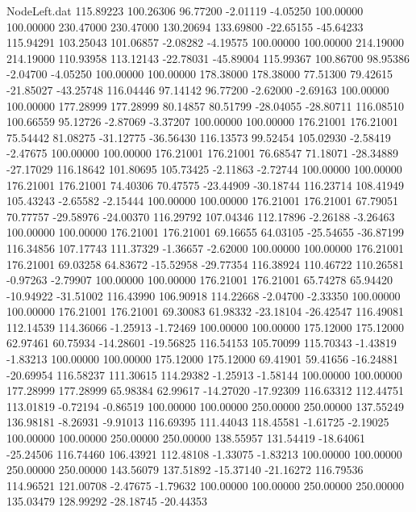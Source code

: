 \begin{filecontents}{NodeLeft.dat}
 115.89223  100.26306   96.77200    -2.01119   -4.05250  100.00000  100.00000  230.47000  230.47000  130.20694  133.69800  -22.65155  -45.64233
 115.94291  103.25043  101.06857    -2.08282   -4.19575  100.00000  100.00000  214.19000  214.19000  110.93958  113.12143  -22.78031  -45.89004
 115.99367  100.86700   98.95386    -2.04700   -4.05250  100.00000  100.00000  178.38000  178.38000   77.51300   79.42615  -21.85027  -43.25748
 116.04446   97.14142   96.77200    -2.62000   -2.69163  100.00000  100.00000  177.28999  177.28999   80.14857   80.51799  -28.04055  -28.80711
 116.08510  100.66559   95.12726    -2.87069   -3.37207  100.00000  100.00000  176.21001  176.21001   75.54442   81.08275  -31.12775  -36.56430
 116.13573   99.52454  105.02930    -2.58419   -2.47675  100.00000  100.00000  176.21001  176.21001   76.68547   71.18071  -28.34889  -27.17029
 116.18642  101.80695  105.73425    -2.11863   -2.72744  100.00000  100.00000  176.21001  176.21001   74.40306   70.47575  -23.44909  -30.18744
 116.23714  108.41949  105.43243    -2.65582   -2.15444  100.00000  100.00000  176.21001  176.21001   67.79051   70.77757  -29.58976  -24.00370
 116.29792  107.04346  112.17896    -2.26188   -3.26463  100.00000  100.00000  176.21001  176.21001   69.16655   64.03105  -25.54655  -36.87199
 116.34856  107.17743  111.37329    -1.36657   -2.62000  100.00000  100.00000  176.21001  176.21001   69.03258   64.83672  -15.52958  -29.77354
 116.38924  110.46722  110.26581    -0.97263   -2.79907  100.00000  100.00000  176.21001  176.21001   65.74278   65.94420  -10.94922  -31.51002
 116.43990  106.90918  114.22668    -2.04700   -2.33350  100.00000  100.00000  176.21001  176.21001   69.30083   61.98332  -23.18104  -26.42547
 116.49081  112.14539  114.36066    -1.25913   -1.72469  100.00000  100.00000  175.12000  175.12000   62.97461   60.75934  -14.28601  -19.56825
 116.54153  105.70099  115.70343    -1.43819   -1.83213  100.00000  100.00000  175.12000  175.12000   69.41901   59.41656  -16.24881  -20.69954
 116.58237  111.30615  114.29382    -1.25913   -1.58144  100.00000  100.00000  177.28999  177.28999   65.98384   62.99617  -14.27020  -17.92309
 116.63312  112.44751  113.01819    -0.72194   -0.86519  100.00000  100.00000  250.00000  250.00000  137.55249  136.98181   -8.26931   -9.91013
 116.69395  111.44043  118.45581    -1.61725   -2.19025  100.00000  100.00000  250.00000  250.00000  138.55957  131.54419  -18.64061  -25.24506
 116.74460  106.43921  112.48108    -1.33075   -1.83213  100.00000  100.00000  250.00000  250.00000  143.56079  137.51892  -15.37140  -21.16272
 116.79536  114.96521  121.00708    -2.47675   -1.79632  100.00000  100.00000  250.00000  250.00000  135.03479  128.99292  -28.18745  -20.44353

\end{filecontents}
